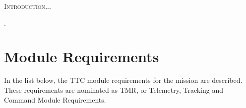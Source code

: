 \documentclass[12pt]{book}
\begin{document}

\lettrine{I}{ntroduction}...


\cite{site}.

\section{Module Requirements}

In the list below, the TTC module requirements for the mission are described. These requirements are nominated as TMR, or Telemetry, Tracking and Command Module Requirements.
\end{document}
